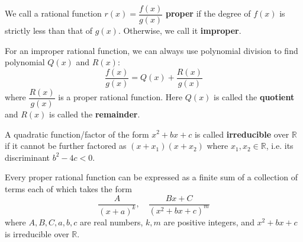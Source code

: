 \documentclass[a4paper]{ctexart}
\begin{document}
    \begin{mydef}
        We call a rational function $r(x)=\dfrac{f(x)}{g(x)}$ \textbf{proper} if the degree of $f(x)$ is strictly less than that of $g(x)$. Otherwise, we call it \textbf{improper}.
    \end{mydef}
    \begin{myrmk}
        For an improper rational function, we can always use polynomial division to find polynomial $Q(x)$ and $R(x)$:
        \[
        \frac{f(x)}{g(x)} = Q(x) + \frac{R(x)}{g(x)}
        \]
        where $\dfrac{R(x)}{g(x)}$ is a proper rational function. Here $Q(x)$ is called the \textbf{quotient} and $R(x)$ is called the \textbf{remainder}.
    \end{myrmk}
    \begin{mydef}
        A quadratic function/factor of the form $x^2+bx+c$ is called \textbf{irreducible} over $\mathbb{R}$ if it cannot be further factored as $(x+x_1)(x+x_2)$ where $x_1,x_2\in \mathbb{R}$, i.e. its discriminant $b^2-4c<0$.
    \end{mydef}
    \begin{mythm}
        Every proper rational function can be expressed as a finite sum of a collection of terms each of which takes the form
        \[
        \frac{A}{(x+a)^k}, \quad \frac{Bx + C}{(x^2 + bx + c)^m}
        \]
        where $A,B,C,a,b,c$ are real numbers, $k,m$ are positive integers, and $x^2 + bx + c$ is irreducible over $\mathbb{R}$.
    \end{mythm}
\end{document}
